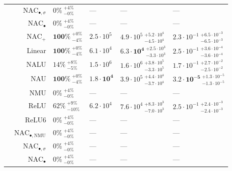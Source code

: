 \begin{longtable}{crllll}
\nopagebreak
 & $\mathrm{NAC}_{\bullet,\sigma}$ & $0\% {~}^{+4\%}_{-0\%}$ & --- & --- & ---\\

\nopagebreak
 & $\mathrm{NAC}_{\bullet}$ & $0\% {~}^{+4\%}_{-0\%}$ & --- & --- & ---\\

\nopagebreak
 & $\mathrm{NAC}_{+}$ & $\mathbf{100\%} {~}^{+0\%}_{-4\%}$ & $2.5 \cdot 10^{5}$ & $4.9 \cdot 10^{5} {~}^{+5.2 \cdot 10^{4}}_{-4.5 \cdot 10^{4}}$ & $2.3 \cdot 10^{-1} {~}^{+6.5 \cdot 10^{-3}}_{-6.5 \cdot 10^{-3}}$\\

\nopagebreak
 & Linear & $\mathbf{100\%} {~}^{+0\%}_{-4\%}$ & $6.1 \cdot 10^{4}$ & $\mathbf{6.3 \cdot 10^{4}} {~}^{+2.5 \cdot 10^{3}}_{-3.3 \cdot 10^{3}}$ & $2.5 \cdot 10^{-1} {~}^{+3.6 \cdot 10^{-4}}_{-3.6 \cdot 10^{-4}}$\\

\nopagebreak
 & NALU & $14\% {~}^{+8\%}_{-5\%}$ & $1.5 \cdot 10^{6}$ & $1.6 \cdot 10^{6} {~}^{+3.8 \cdot 10^{5}}_{-3.3 \cdot 10^{5}}$ & $1.7 \cdot 10^{-1} {~}^{+2.7 \cdot 10^{-2}}_{-2.5 \cdot 10^{-2}}$\\

\nopagebreak
 & NAU & $\mathbf{100\%} {~}^{+0\%}_{-4\%}$ & $\mathbf{1.8 \cdot 10^{4}}$ & $3.9 \cdot 10^{5} {~}^{+4.4 \cdot 10^{4}}_{-3.7 \cdot 10^{4}}$ & $\mathbf{3.2 \cdot 10^{-5}} {~}^{+1.3 \cdot 10^{-5}}_{-1.3 \cdot 10^{-5}}$\\

\nopagebreak
 & NMU & $0\% {~}^{+4\%}_{-0\%}$ & --- & --- & ---\\

\nopagebreak
 & ReLU & $62\% {~}^{+9\%}_{-10\%}$ & $6.2 \cdot 10^{4}$ & $7.6 \cdot 10^{4} {~}^{+8.3 \cdot 10^{3}}_{-7.0 \cdot 10^{3}}$ & $2.5 \cdot 10^{-1} {~}^{+2.4 \cdot 10^{-3}}_{-2.4 \cdot 10^{-3}}$\\

\nopagebreak
\multirow{-10}{*}{\centering\arraybackslash $\bm{+}$} & ReLU6 & $0\% {~}^{+4\%}_{-0\%}$ & --- & --- & ---\\
\cmidrule{1-6}
 & $\mathrm{NAC}_{\bullet,\mathrm{NMU}}$ & $0\% {~}^{+4\%}_{-0\%}$ & --- & --- & ---\\

\nopagebreak
 & $\mathrm{NAC}_{\bullet,\sigma}$ & $0\% {~}^{+4\%}_{-0\%}$ & --- & --- & ---\\

\nopagebreak
 & $\mathrm{NAC}_{\bullet}$ & $0\% {~}^{+4\%}_{-0\%}$ & --- & --- & ---\\


\end{longtable}
